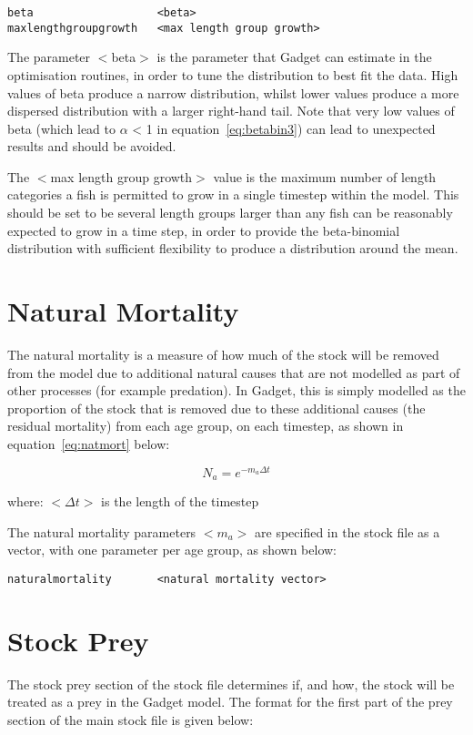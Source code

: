 \documentclass[10pt,twoside]{book}
\begin{document}
{\small\begin{verbatim}
beta                   <beta>
maxlengthgroupgrowth   <max length group growth>
\end{verbatim}}

The parameter $<$beta$>$ is the parameter that Gadget can estimate in the optimisation routines, in order to tune the distribution to best fit the data.  High values of beta produce a narrow distribution, whilst lower values produce a more dispersed distribution with a larger right-hand tail.  Note that very low values of beta (which lead to $\alpha$ < 1 in equation~\ref{eq:betabin3}) can lead to unexpected results and should be avoided.

\bigskip
The $<$max length group growth$>$ value is the maximum number of length categories a fish is permitted to grow in a single timestep within the model.  This should be set to be several length groups larger than any fish can be reasonably expected to grow in a time step, in order to provide the beta-binomial distribution with sufficient flexibility to produce a distribution around the mean.

\section{Natural Mortality}\label{sec:stocknatmort}
The natural mortality is a measure of how much of the stock will be removed from the model due to additional natural causes that are not modelled as part of other processes (for example predation).  In Gadget, this is simply modelled as the proportion of the stock that is removed due to these additional causes (the residual mortality) from each age group, on each timestep, as shown in equation~\ref{eq:natmort} below:

\begin{equation}\label{eq:natmort}
N_{a} = e^{-m_{a} \Delta t}
\end{equation}

where:\newline
$<\Delta t>$ is the length of the timestep

\bigskip
The natural mortality parameters $<m_{a}>$ are specified in the stock file as a vector, with one parameter per age group, as shown below:

{\small\begin{verbatim}
naturalmortality       <natural mortality vector>
\end{verbatim}}

\section{Stock Prey}\label{sec:stockprey}
The stock prey section of the stock file determines if, and how, the stock will be treated as a prey in the Gadget model.  The format for the first part of the prey section of the main stock file is given below:
\end{document}
